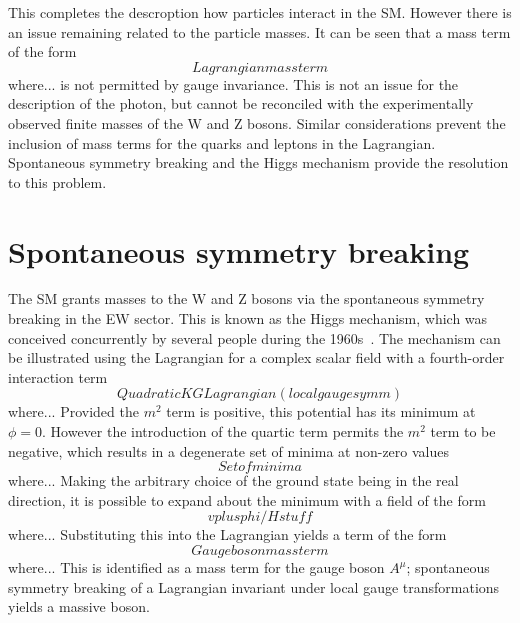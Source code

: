 This completes the descroption how particles interact in the SM.
However there is an issue remaining related to the particle masses.
It can be seen that a mass term of the form
\begin{equation}
Lagrangian mass term
\end{equation}
where... 
is not permitted by gauge invariance.
This is not an issue for the description of the photon, 
but cannot be reconciled with the experimentally observed finite masses of the W and Z bosons.
Similar considerations prevent the inclusion of mass terms 
for the quarks and leptons in the Lagrangian.
Spontaneous symmetry breaking and the Higgs mechanism provide the resolution to this problem.

\section{Spontaneous symmetry breaking}

The SM grants masses to the W and Z bosons via the spontaneous symmetry breaking 
in the EW sector.
This is known as the Higgs mechanism, 
which was conceived concurrently by several people 
during the 1960s~\cite{HiggsPaper,BroutEnglert,KibbleEtc}.
The mechanism can be illustrated using the Lagrangian 
for a complex scalar field with a fourth-order interaction term
\begin{equation}
Quadratic KG Lagrangian (local gauge symm)
\end{equation}
where... 
Provided the $m^2$ term is positive, this potential has its minimum at $\phi=0$.
However the introduction of the quartic term permits the $m^2$ term to be negative, 
which results in a degenerate set of minima at non-zero values
\begin{equation}
Set of minima
\end{equation}
where... 
Making the arbitrary choice of the ground state being in the real direction, 
it is possible to expand about the minimum with a field of the form
\begin{equation}
v plus phi/H stuff
\end{equation}
where... 
Substituting this into the Lagrangian yields a term of the form
\begin{equation}
Gauge boson mass term
\end{equation}
where... 
This is identified as a mass term for the gauge boson $A^{\mu}$;
spontaneous symmetry breaking of a Lagrangian invariant under local gauge transformations 
yields a massive boson. 

